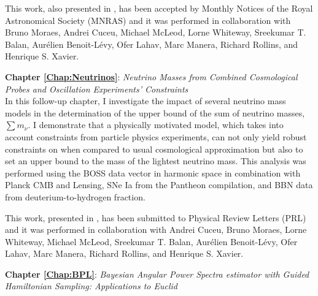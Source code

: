 \qquad This work, also presented in \cite{2018LoureiroBOSS}, has been accepted by Monthly Notices of the Royal Astronomical Society (MNRAS) and it was performed in collaboration with Bruno Moraes, Andrei Cuceu, Michael McLeod, Lorne Whiteway, Sreekumar T. Balan, Aur\'elien Benoit-L\'evy, Ofer Lahav, Marc Manera, Richard Rollins, and Henrique S. Xavier.

\bigskip

\textbf{Chapter \ref{Chap:Neutrinos}}: \textit{Neutrino Masses from Combined Cosmological Probes and Oscillation Experiments' Constraints} \\[0.6em]
In this follow-up chapter, I investigate the impact of several neutrino mass models in the determination of the upper bound of the sum of neutrino masses, $\sum m_{\nu}$. I demonstrate that a physically motivated model, which takes into account constraints from particle physics experiments, can not only yield robust constraints on \NM{} when compared to usual cosmological approximation but also to set an upper bound to the mass of the lightest neutrino mass. This analysis was performed using the BOSS data vector in harmonic space in combination with Planck CMB and Lensing, SNe Ia from the Pantheon compilation, and BBN data from deuterium-to-hydrogen fraction.

\qquad This work, presented in \cite{2018LoureiroNeutrinos}, has been submitted to Physical Review Letters (PRL) and it was performed in collaboration with  Andrei Cuceu, Bruno Moraes, Lorne Whiteway, Michael McLeod, Sreekumar T. Balan, Aur\'elien Benoit-L\'evy, Ofer Lahav, Marc Manera, Richard Rollins, and Henrique S. Xavier.

\bigskip

\textbf{Chapter \ref{Chap:BPL}}: \textit{Bayesian Angular Power Spectra estimator with Guided Hamiltonian Sampling: Applications to Euclid} \\[0.6em]

